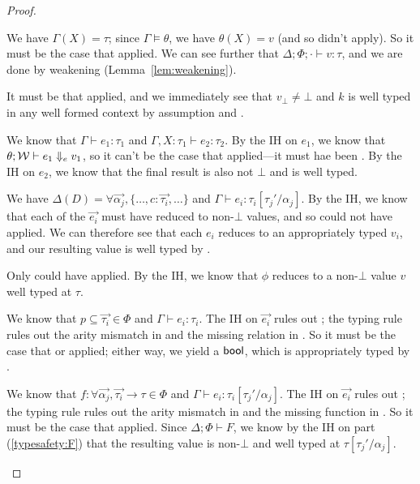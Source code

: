 \documentclass[acmsmall,screen,nonacm]{acmart}
\theoremstyle{definition}
\begin{document}
\begin{lemma}
\begin{proof}
\begin{proofcases}
  \item[(\rn{$e$-Var})] We have $\Gamma(X) = \tau$; since
  $\Gamma \models \theta$, we have $\theta(X) = v$ (and
  so  didn't apply). So it must be the case
  that  applied. We can see further that
  $\Delta; \Phi; \cdot \vdash v : \tau$, and we are done by weakening
  (Lemma~\ref{lem:weakening}).

  \item[(\rn{$e$-Const})] It must be that 
  applied, and we immediately see that $v_\bot \ne \bot$ and $k$ is
  well typed in any well formed context by assumption
  and .

  \item[(\rn{$e$-Let})] We know that $\Gamma \vdash e_1 : \tau_1$ and
  $\Gamma, X:\tau_1 \vdash e_2 : \tau_2$. By the IH on $e_1$, we know
  that $\theta; \mathcal{W} \vdash e_1 \Downarrow_e v_1$, so it can't be the
  case that  applied---it must hae
  been . By the IH on $e_2$, we know that the
  final result is also not $\bot$ and is well typed.

  \item[(\rn{$e$-Ctor})] We have $\Delta(D)
  = \forall \vec{\alpha_j}, \{ \dots, c : \vec{\tau_i}, \dots \}$ and
  $\Gamma \vdash e_i : \tau_i[\tau_j'/\alpha_j]$. By the IH, we know
  that each of the $\vec{e_i}$ must have reduced to non-$\bot$ values,
  and so  could not have applied. We can
  therefore see that each $e_i$ reduces to an appropriately typed
  $v_i$, and our resulting value is well typed by .

  \item[(\rn{$e$-Quote})] Only  could have
  applied. By the IH, we know that $\phi$ reduces to a non-$\bot$
  value $v$ well typed at $\tau$.

  \item[(\rn{$e$-Rel})] We know that
  $p \subseteq \vec{\tau_i} \in \Phi$ and $\Gamma \vdash e_i
  : \tau_i$. The IH on $\vec{e_i}$ rules out ;
  the typing rule rules out the arity mismatch
  in  and the missing relation
  in . So it must be the case
  that  or 
  applied; either way, we yield a $\mathsf{bool}$, which is appropriately
  typed by .

  \item[(\rn{$e$-Fun})] We know that $f
  : \forall \vec{\alpha_j}, \vec{\tau_i} \rightarrow \tau \in \Phi$
  and $\Gamma \vdash e_i : \tau_i[\tau_j'/\alpha_j]$. The IH on
  $\vec{e_i}$ rules out ; the typing rule rules
  out the arity mismatch in  and the missing
  function in . So it must be the case
  that  applied. Since $\Delta; \Phi \vdash F$, we
  know by the IH on part (\ref{typesafety:F}) that the resulting value
  is non-$\bot$ and well typed at $\tau[\tau_j'/\alpha_j]$.


\end{proofcases}
\end{proof}
\end{lemma}
\end{document}
